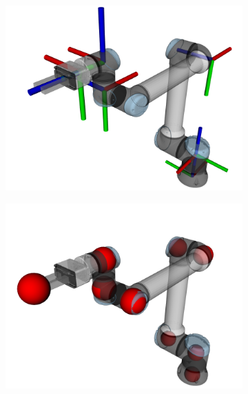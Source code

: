 \begin{figure}[h]
    \centering
    \begin{subfigure}{.33\linewidth}
      \centering
      \includegraphics[width=.95\linewidth]{figs/chp4/self_ident_links.png}
    \end{subfigure}%
    \begin{subfigure}{.33\linewidth}
      \centering
      \includegraphics[width=.95\linewidth]{figs/chp4/self_ident_points.png}
    \end{subfigure}%
    \begin{subfigure}{.33\linewidth}
        \centering

\end{subfigure}
\end{figure}
